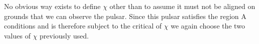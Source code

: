 \documentclass[11pt]{article}
\numberwithin{equation}{section}
\numberwithin{figure}{section}
\numberwithin{table}{section}
\begin{document}
No obvious way exists to define $\chi$ other than to assume it must not be aligned on grounds that we can observe the pulsar. Since this pulsar satisfies the region A conditions and is therefore subject to the critical of $\chi$ we again choose the two values of $\chi$ previously used.
\FloatBarrier
\end{document}
